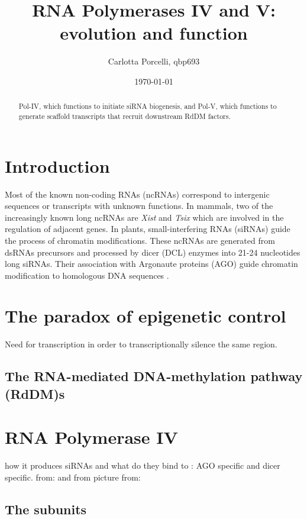 \documentclass[a4paper, twocolumn]{article}
\title{RNA Polymerases IV and V: evolution and function}
\author{Carlotta Porcelli, qbp693}
\date{\today}
\begin{document}
\maketitle

\begin{abstract}
	
Pol-IV, which functions to initiate siRNA biogenesis, and Pol-V, which functions to generate scaffold transcripts that recruit downstream RdDM factors. 

\end{abstract}

\section{Introduction}
Most of the known non-coding RNAs (ncRNAs) correspond to intergenic sequences or transcripts with unknown functions. In mammals, two of the increasingly known long ncRNAs are \textit{Xist} and \textit{Tsix} which are involved in the regulation of adjacent genes. 
In plants, small-interfering RNAs (siRNAs) guide the process of chromatin modifications. These ncRNAs are generated from dsRNAs precursors and processed by dicer (DCL) enzymes into 21-24 nucleotides long siRNAs. Their association with Argonaute proteins (AGO) guide chromatin modification to homologous DNA sequences \cite{BRODERSEN2006}.


\section{The paradox of epigenetic control}
Need for transcription in order to transcriptionally silence the same region. \cite{paradox}

\subsection{The RNA-mediated DNA-methylation pathway (RdDM)s}


\section{RNA Polymerase IV}
how it produces siRNAs and what do they bind to : AGO specific and dicer specific. 
from:  \cite{Zhang130} and from \cite{ONODERA2005}
picture from: \cite{Xu2013}

\subsection{The subunits}
\end{document}
